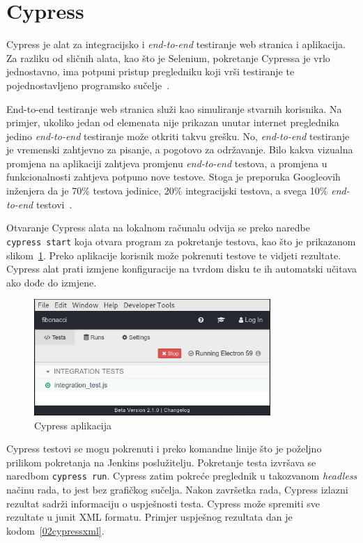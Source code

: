 \section{Cypress}
Cypress je alat za integracijsko i \textit{end-to-end} testiranje web stranica i aplikacija. Za
razliku od sličnih alata, kao što je Selenium, pokretanje Cypressa je vrlo jednostavno, ima potpuni
pristup pregledniku koji vrši testiranje te pojednostavljeno programsko sučelje~\citep{Cypress}.

End-to-end testiranje web stranica služi kao simuliranje stvarnih korisnika. Na primjer, ukoliko
jedan od elemenata nije prikazan unutar internet preglednika jedino \textit{end-to-end} testiranje
može otkriti takvu grešku. No, \textit{end-to-end} testiranje je vremenski zahtjevno za pisanje, a
pogotovo za održavanje. Bilo kakva vizualna promjena na aplikaciji zahtjeva promjenu
\textit{end-to-end} testova, a promjena u funkcionalnosti zahtjeva potpuno nove testove. Stoga je
preporuka Googleovih inženjera da je 70\% testova jedinice, 20\% integracijski testova, a svega 10\%
\textit{end-to-end} testovi~\citep{google-2015}.

Otvaranje Cypress alata na lokalnom računalu odvija se preko naredbe \texttt{cypress~start} koja
otvara program za pokretanje testova, kao što je prikazanom slikom~\ref{fig:02cypress}. Preko
aplikacije korisnik može pokrenuti testove te vidjeti rezultate. Cypress alat prati izmjene
konfiguracije na
tvrdom disku te ih automatski učitava ako dođe do izmjene.

\begin{figure}[h]
    \centering
    \includegraphics[width=0.8\textwidth]{img/02/cypress.png}
    \caption{Cypress aplikacija}%
    \label{fig:02cypress}
\end{figure}

Cypress testovi se mogu pokrenuti i preko komandne linije što je poželjno prilikom pokretanja na
Jenkins poslužitelju. Pokretanje testa izvršava se naredbom \texttt{cypress~run}. Cypress zatim
pokreće preglednik u takozvanom \textit{headless} načinu rada, to jest bez grafičkog sučelja. Nakon
završetka rada, Cypress izlazni rezultat sadrži informaciju o uspješnosti testa. Cypress može
spremiti sve rezultate u junit XML formatu. Primjer uspješnog rezultata dan je
kodom~\ref{02cypressxml}.

